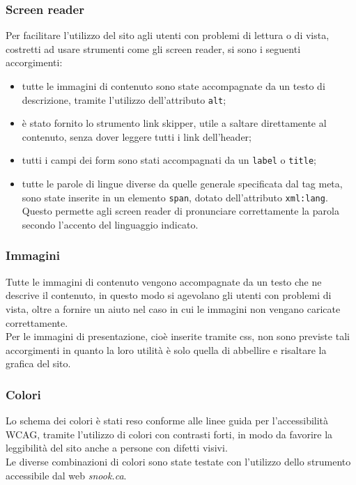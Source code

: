 		\subsubsection{Screen reader}
		Per facilitare l'utilizzo del sito agli utenti con problemi di lettura o di vista, costretti ad usare strumenti come gli screen reader, si sono i seguenti accorgimenti:
		\begin{itemize}
			\item tutte le immagini di contenuto sono state accompagnate da un testo di descrizione, tramite l'utilizzo dell'attributo \texttt{alt};
			\item è stato fornito lo strumento link skipper, utile a saltare direttamente al contenuto, senza dover leggere tutti i link dell'header;
			\item tutti i campi dei form sono stati accompagnati da un \texttt{label} o \texttt{title};
			\item tutte le parole di lingue diverse da quelle generale specificata dal tag meta, sono state inserite in un elemento \texttt{span}, dotato dell'attributo \texttt{xml:lang}. Questo permette agli screen reader di pronunciare correttamente la parola secondo l'accento del linguaggio indicato.
		\end{itemize}
		\subsubsection{Immagini}
		Tutte le immagini di contenuto vengono accompagnate da un testo che ne descrive il contenuto, in questo modo si agevolano gli utenti con problemi di vista, oltre a fornire un aiuto nel caso in cui le immagini non vengano caricate correttamente. \\
		Per le immagini di presentazione, cioè inserite tramite css, non sono previste tali accorgimenti in quanto la loro utilità è solo quella di abbellire e risaltare la grafica del sito.
		\subsubsection{Colori}
		Lo schema dei colori è stati reso conforme alle linee guida per l'accessibilità WCAG, tramite l'utilizzo di colori con contrasti forti, in modo da favorire la leggibilità del sito anche a persone con difetti visivi. \\
		Le diverse combinazioni di colori sono state testate con l'utilizzo dello strumento accessibile dal web \textit{snook.ca}.
